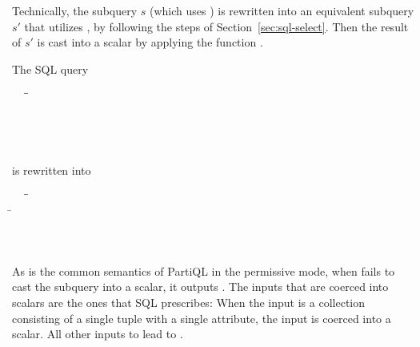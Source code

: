 Technically, the subquery $s$ (which uses ) is rewritten into an
equivalent subquery $s'$ that utilizes , by following the steps
of Section~\ref{sec:sql-select}. Then the result of $s'$ is cast into a scalar
by applying the function . 

\begin{example} The SQL query
\begin{tabbing}
\ \ \ \=\=\\ 
\>\>\\
\>\>\\
\>\>\\
\>
\end{tabbing}
\noindent is rewritten into 
\begin{tabbing}
\ \ \ \=\=\\
\>\>\=\\
\>\>\>\\
\>\>\>\\
\>
\end{tabbing}
\end{example}

As is the common semantics of PartiQL in the permissive mode, when
 fails to cast the subquery into a scalar, it outputs
\MISSING. The inputs that are coerced into scalars are the ones that SQL
prescribes: When the input is a collection consisting of a single tuple with a
single attribute, the input is coerced into a scalar. All other inputs to
 lead to \MISSING.

